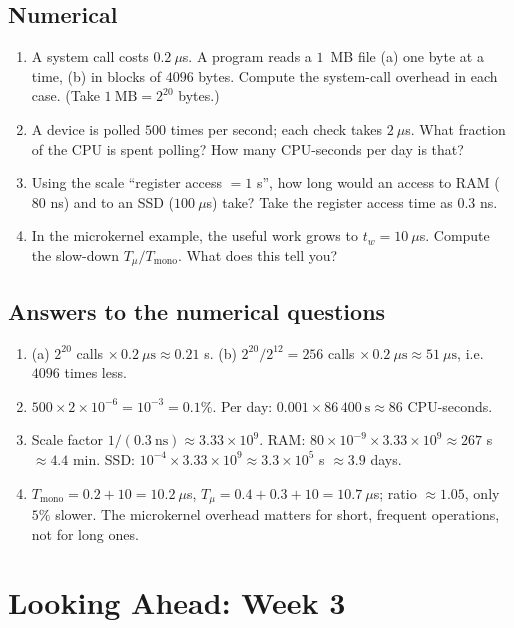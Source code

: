 \documentclass[11pt,a4paper]{article}
\begin{document}
\subsection*{Numerical}
\begin{enumerate}[leftmargin=1.6em,resume]
  \item A system call costs $0.2\ \mu$s. A program reads a $1$~MB file (a) one byte at a time, (b) in blocks of $4096$ bytes. Compute the system-call overhead in each case. (Take $1\ \text{MB} = 2^{20}$ bytes.)
  \item A device is polled $500$ times per second; each check takes $2\ \mu$s. What fraction of the CPU is spent polling? How many CPU-seconds per day is that?
  \item Using the scale ``register access $=1$ s'', how long would an access to RAM ($80$ ns) and to an SSD ($100\ \mu$s) take? Take the register access time as $0.3$ ns.
  \item In the microkernel example, the useful work grows to $t_{w} = 10\ \mu$s. Compute the slow-down $T_{\mu}/T_{\text{mono}}$. What does this tell you?
\end{enumerate}

\subsection*{Answers to the numerical questions}
\begin{enumerate}[leftmargin=1.6em,start=11]
  \item (a) $2^{20}$ calls $\times\, 0.2\ \mu\text{s} \approx 0.21$ s. (b) $2^{20}/2^{12} = 256$ calls $\times\, 0.2\ \mu\text{s} \approx 51\ \mu\text{s}$, i.e.\ $4096$ times less.
  \item $500 \times 2\times10^{-6} = 10^{-3} = 0.1\%$. Per day: $0.001 \times 86\,400\ \text{s} \approx 86$ CPU-seconds.
  \item Scale factor $1/(0.3\ \text{ns}) \approx 3.33\times10^{9}$. RAM: $80\times10^{-9} \times 3.33\times10^{9} \approx 267$ s $\approx 4.4$ min. SSD: $10^{-4} \times 3.33\times10^{9} \approx 3.3\times10^{5}$ s $\approx 3.9$ days.
  \item $T_{\text{mono}} = 0.2 + 10 = 10.2\ \mu$s, $T_{\mu} = 0.4 + 0.3 + 10 = 10.7\ \mu$s; ratio $\approx 1.05$, only $5\%$ slower. The microkernel overhead matters for short, frequent operations, not for long ones.
\end{enumerate}

\section{Looking Ahead: Week 3}
\end{document}
